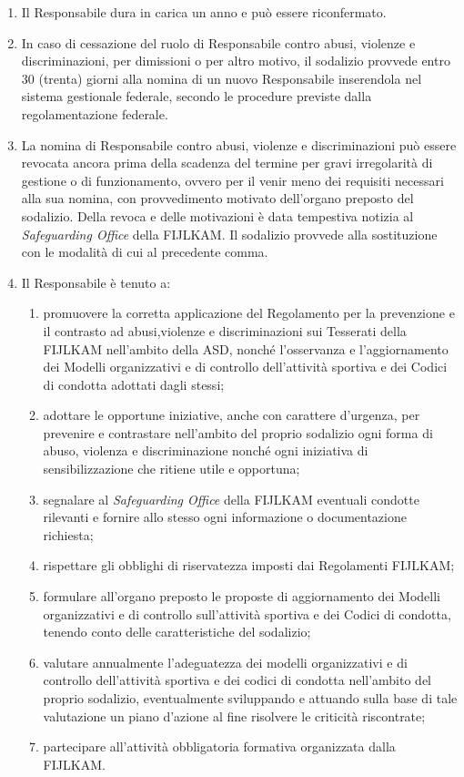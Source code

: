 \documentclass{djtsdoc}
\begin{document}
\begin{enumerate}
		\item Il Responsabile dura in carica un anno e può essere riconfermato.
		\item In caso di cessazione del ruolo di Responsabile contro abusi, violenze e discriminazioni, per dimissioni o per altro motivo, il sodalizio provvede entro 30 (trenta) giorni alla nomina di un nuovo Responsabile inserendola nel sistema gestionale federale, secondo le procedure previste dalla regolamentazione federale.
		\item La nomina di Responsabile contro abusi, violenze e discriminazioni può essere revocata ancora prima della scadenza del termine per gravi irregolarità di gestione o di funzionamento, ovvero per il venir meno dei requisiti necessari alla sua nomina, con provvedimento motivato dell'organo preposto del sodalizio. Della revoca e delle motivazioni è data tempestiva notizia al \textit{Safeguarding Office} della FIJLKAM. Il sodalizio provvede alla sostituzione con le modalità di cui al precedente comma.
		\item Il Responsabile è tenuto a:
		\begin{enumerate}
			\item promuovere la corretta applicazione del Regolamento per la prevenzione e il contrasto ad abusi,violenze e discriminazioni sui Tesserati della FIJLKAM nell'ambito della ASD, nonché l'osservanza e l'aggiornamento dei Modelli organizzativi e di controllo dell'attività sportiva e dei Codici di condotta adottati dagli stessi;
			\item adottare le opportune iniziative, anche con carattere d'urgenza, per prevenire e contrastare nell'ambito del proprio sodalizio ogni forma di abuso, violenza e discriminazione nonché ogni iniziativa di sensibilizzazione che ritiene utile e opportuna;
			\item segnalare al \textit{Safeguarding Office} della FIJLKAM eventuali condotte rilevanti e fornire allo stesso ogni informazione o documentazione richiesta;
			\item rispettare gli obblighi di riservatezza imposti dai Regolamenti FIJLKAM;
			\item formulare all'organo preposto le proposte di aggiornamento dei Modelli organizzativi e di controllo sull'attività sportiva e dei Codici di condotta, tenendo conto delle caratteristiche del sodalizio;
			\item valutare annualmente l'adeguatezza dei modelli organizzativi e di controllo dell'attività sportiva e dei codici di condotta nell'ambito del proprio sodalizio, eventualmente sviluppando e attuando sulla base di tale valutazione un piano d'azione al fine risolvere le criticità riscontrate; 
			\item partecipare all'attività obbligatoria formativa organizzata dalla FIJLKAM.
		\end{enumerate}
	\end{enumerate}
	
\end{document}
